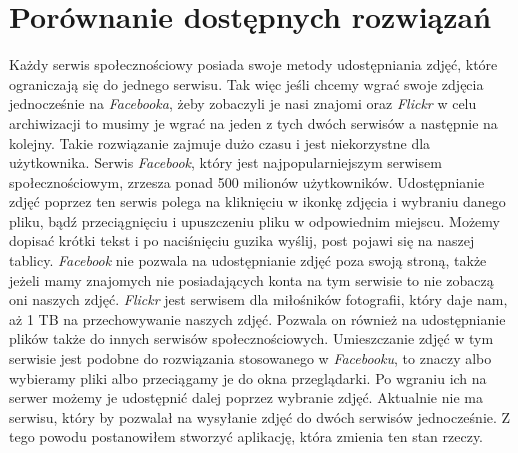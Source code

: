 \documentclass[openright]{xmgr}
\begin{document}
\section{Porównanie dostępnych rozwiązań}
Każdy serwis społecznościowy posiada swoje metody udostępniania zdjęć, które ograniczają się do jednego serwisu. Tak więc jeśli chcemy wgrać swoje zdjęcia jednocześnie na \textit{Facebooka}, żeby zobaczyli je nasi znajomi oraz \textit{Flickr} w celu archiwizacji to musimy je wgrać na jeden z tych dwóch serwisów a następnie na kolejny. Takie rozwiązanie zajmuje dużo czasu i jest niekorzystne dla użytkownika. Serwis \textit{Facebook}, który jest najpopularniejszym serwisem społecznościowym, zrzesza ponad 500 milionów użytkowników. Udostępnianie zdjęć poprzez ten serwis polega na kliknięciu w ikonkę zdjęcia i wybraniu danego pliku, bądź przeciągnięciu i upuszczeniu pliku w odpowiednim miejscu. Możemy dopisać krótki tekst i po naciśnięciu guzika wyślij, post pojawi się na naszej tablicy. \textit{Facebook} nie pozwala na udostępnianie zdjęć poza swoją stroną, także jeżeli mamy znajomych nie posiadających konta na tym serwisie to nie zobaczą oni naszych zdjęć. \newline \indent \textit{Flickr} jest serwisem dla miłośników fotografii, który daje nam, aż 1 TB na przechowywanie naszych zdjęć. Pozwala on również na udostępnianie plików także do innych serwisów społecznościowych. Umieszczanie zdjęć w tym serwisie jest podobne do rozwiązania stosowanego w \textit{Facebooku}, to znaczy albo wybieramy pliki albo przeciągamy je do okna przeglądarki. Po wgraniu ich na serwer możemy je udostępnić dalej poprzez wybranie zdjęć. Aktualnie nie ma serwisu, który by pozwalał na wysyłanie zdjęć do dwóch serwisów jednocześnie. Z tego powodu postanowiłem stworzyć aplikację, która zmienia ten stan rzeczy.
\end{document}
